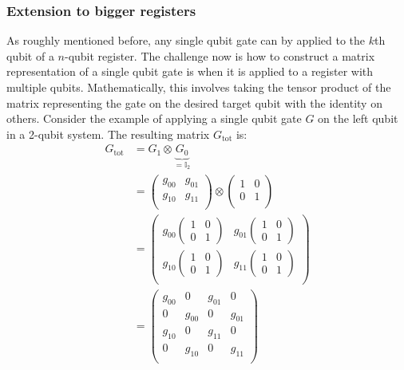 \documentclass[bibliography=totocnumbered, 10pt]{article}
\theoremstyle{NoticeStyle}
\begin{document}
\subsubsection{Extension to bigger registers}\label{sec:Extension to bigger registers}
As roughly mentioned before, any single qubit gate can by applied to the $k$th qubit of a $n$-qubit register. The challenge now is how to construct a matrix representation of a single qubit gate is when it is applied to a register with multiple qubits. Mathematically, this involves taking the tensor product of the matrix representing the gate on the desired target qubit with the identity on others. Consider the example of applying a single qubit gate $G$ on the left qubit in a 2-qubit system. The resulting matrix $G_\text{tot}$ is:
%
\begin{align}
	G_\text{tot} 
	&= G_1 \otimes \underbrace{G_0}_{=\mathbb{I}_2}\\
	&=
	\begin{pmatrix}
		g_{00} & g_{01}\\
		g_{10} & g_{11}\\
	\end{pmatrix}
	\otimes
	\begin{pmatrix}
		1 & 0\\
		0 & 1\\
	\end{pmatrix}\\
	&=
	\begin{pmatrix}
		g_{00} \left(\begin{smallmatrix}1& 0\\ 0& 1\end{smallmatrix}\right) & g_{01} \left(\begin{smallmatrix}1& 0\\ 0& 1\end{smallmatrix}\right)\\
		g_{10} \left(\begin{smallmatrix}1& 0\\ 0& 1\end{smallmatrix}\right) & g_{11} \left(\begin{smallmatrix}1& 0\\ 0& 1\end{smallmatrix}\right)\\
	\end{pmatrix}
	\\
	&=
	\begin{pmatrix}
		g_{00} & 0 & g_{01} & 0\\
		0 & g_{00} & 0 & g_{01}\\
		g_{10} & 0 & g_{11} & 0\\
		0 & g_{10} & 0 & g_{11}\\
	\end{pmatrix}
\end{align}
\end{document}
